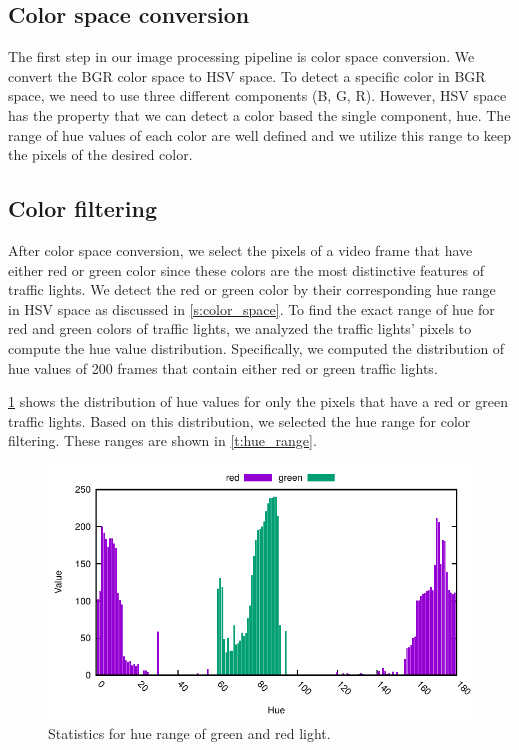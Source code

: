 

\subsection{Color space conversion}
The first step in our image processing pipeline is color space conversion.
We convert the BGR color space to HSV space.
To detect a specific color in BGR space, we need to use three different components (B, G, R).
However, HSV space has the property that we can detect a color based the single component, hue.
The range of hue values of each color are well defined and we utilize this range to keep the pixels of the desired color.


\subsection{Color filtering}
After color space conversion, we select the pixels of a video frame that have either red or green color since these colors are the most distinctive features of traffic lights.
We detect the red or green color by their corresponding hue range in HSV space as discussed in \ref{s:color_space}. 
To find the exact range of hue for red and green colors of traffic lights, we analyzed the traffic lights' pixels to compute the hue value distribution.
Specifically, we computed the distribution of hue values of 200 frames that contain either red or green traffic lights. 

\ref{f:light_hue} shows the distribution of hue values for only the pixels that have a red or green traffic lights.
Based on this distribution, we selected the hue range for color filtering. 
These ranges are shown in \ref{t:hue_range}.


\begin{figure}[!ht]
\centering
\includegraphics[width=5.2in]{plots/stat_light.pdf}
\caption{Statistics for hue range of green and red light.}
\label{f:light_hue}
\end{figure}


